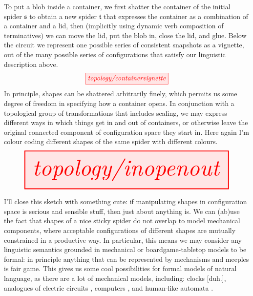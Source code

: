 \begin{example}
To put a blob inside a container, we first shatter the container of the initial spider $\mathfrak{s}$ to obtain a new spider $\mathfrak{t}$ that expresses the container as a combination of a container and a lid, then (implicitly using dynamic verb composition of terminatives) we can move the lid, put the blob in, close the lid, and glue. Below the circuit we represent one possible series of consistent snapshots as a vignette, out of the many possible series of configurations that satisfy our linguistic description above.
\[\tikzfig{topology/containervignette}\]
In principle, shapes can be shattered arbitrarily finely, which permits us some degree of freedom in specifying how a container opens. In conjunction with a topological group of transformations that includes scaling, we may express different ways in which things get in and out of containers, or otherwise leave the original connected component of configuration space they start in. Here again I'm colour coding different shapes of the same spider with different colours.
\[\resizebox{\textwidth}{!}{\tikzfig{topology/inopenout}}\]
\end{example}

I'll close this sketch with something cute: if manipulating shapes in configuration space is serious and sensible stuff, then just about anything is. We can (ab)use the fact that shapes of a nice sticky spider do not overlap to model mechanical components, where acceptable configurations of different shapes are mutually constrained in a productive way. In particular, this means we may consider any linguistic semantics grounded in mechanical or boardgame-tabletop models to be formal: in principle anything that can be represented by mechanisms and meeples is fair game. This gives us some cool possibilities for formal models of natural language, as there are a lot of mechanical models, including: clocks [duh.], analogues of electric circuits \citep{noauthor_spintronics_nodate}, computers \citep{richard_ridel_mechanical_2015}, and human-like automata \citep{wikipedia_authors_jaquet-droz_2022}.

